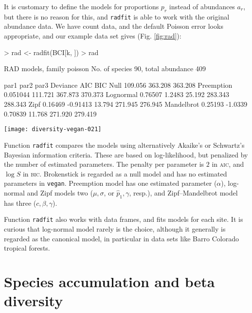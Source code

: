 \documentclass[a4paper,10pt]{amsart}
\begin{document}
It is customary to define the models for proportions $p_r$ instead of
abundances $a_r$, but there is no reason for this, and \texttt{radfit}
is able to work with the original abundance data.  We have count data,
and the default Poisson error looks appropriate, and our example data
set gives (Fig. \ref{fig:rad}):
\begin{Schunk}
\begin{Sinput}
> rad <- radfit(BCI[k, ])
> rad
\end{Sinput}
\begin{Soutput}
RAD models, family poisson 
No. of species 90, total abundance 409

           par1      par2     par3     Deviance AIC     BIC    
Null                                   109.056  363.208 363.208
Preemption  0.051044                   111.721  367.873 370.373
Lognormal   0.76507   1.2483            25.192  283.343 288.343
Zipf        0.16469  -0.91413           13.794  271.945 276.945
Mandelbrot  0.25193  -1.0339   0.70839  11.768  271.920 279.419
\end{Soutput}
\end{Schunk}
\begin{SCfigure}
\texttt{[image: diversity-vegan-021]}
\caption{Ranked abundance distribution models for a random plot
  (no. 9).  The best model is chosen by the \textsc{aic}, and
  displayed with a thick line.}
\label{fig:rad}
\end{SCfigure}

Function \texttt{radfit} compares the models using alternatively
Akaike's or Schwartz's Bayesian information criteria.  These are based
on log-likelihood, but penalized by the number of estimated
parameters.  The penalty per parameter is $2$ in \textsc{aic}, and
$\log S$ in \textsc{bic}.  Brokenstick is regarded as a null model and
has no estimated parameters in \texttt{vegan}.  Preemption model has
one estimated parameter ($\alpha$), log-normal and Zipf models two
($\mu, \sigma$, or $\hat p_1, \gamma$, resp.), and Zipf--Mandelbrot
model has three ($c, \beta, \gamma$).

Function \texttt{radfit} also works with data frames, and fits models
for each site. It is curious that log-normal model rarely is the
choice, although it generally is regarded as the canonical model, in
particular in data sets like Barro Colorado tropical forests.

\section{Species accumulation and beta diversity}
\end{document}
